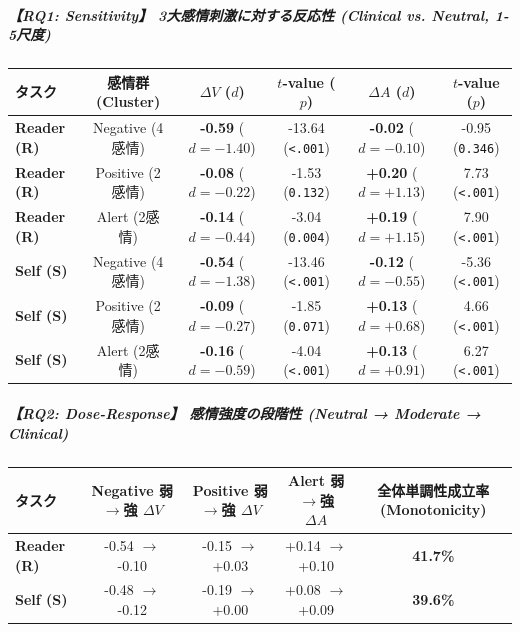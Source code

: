 \subparagraph{【RQ1: Sensitivity】 3大感情刺激に対する反応性 (Clinical vs. Neutral, 1-5尺度)}
\begin{center}
\small
\begin{tabular}{lccccc}
\toprule
\textbf{タスク} & \textbf{感情群 (Cluster)} & \textbf{$\Delta V$ ($d$)} & \textbf{$t$-value ($p$)} & \textbf{$\Delta A$ ($d$)} & \textbf{$t$-value ($p$)} \\
\midrule
\textbf{Reader (R)} & Negative (4感情) & \textbf{-0.59} ($d=-1.40$) & -13.64 (\texttt{<.001}) & \textbf{-0.02} ($d=-0.10$) & -0.95 (\texttt{0.346}) \\
\textbf{Reader (R)} & Positive (2感情) & \textbf{-0.08} ($d=-0.22$) & -1.53 (\texttt{0.132}) & \textbf{+0.20} ($d=+1.13$) & 7.73 (\texttt{<.001}) \\
\textbf{Reader (R)} & Alert (2感情) & \textbf{-0.14} ($d=-0.44$) & -3.04 (\texttt{0.004}) & \textbf{+0.19} ($d=+1.15$) & 7.90 (\texttt{<.001}) \\
\textbf{Self (S)} & Negative (4感情) & \textbf{-0.54} ($d=-1.38$) & -13.46 (\texttt{<.001}) & \textbf{-0.12} ($d=-0.55$) & -5.36 (\texttt{<.001}) \\
\textbf{Self (S)} & Positive (2感情) & \textbf{-0.09} ($d=-0.27$) & -1.85 (\texttt{0.071}) & \textbf{+0.13} ($d=+0.68$) & 4.66 (\texttt{<.001}) \\
\textbf{Self (S)} & Alert (2感情) & \textbf{-0.16} ($d=-0.59$) & -4.04 (\texttt{<.001}) & \textbf{+0.13} ($d=+0.91$) & 6.27 (\texttt{<.001}) \\
\bottomrule
\end{tabular}
\end{center}


\subparagraph{【RQ2: Dose-Response】 感情強度の段階性 (Neutral → Moderate → Clinical)}
\begin{center}
\small
\begin{tabular}{lcccc}
\toprule
\textbf{タスク} & \textbf{Negative 弱$\rightarrow$強 $\Delta V$} & \textbf{Positive 弱$\rightarrow$強 $\Delta V$} & \textbf{Alert 弱$\rightarrow$強 $\Delta A$} & \textbf{全体単調性成立率 (Monotonicity)} \\
\midrule
\textbf{Reader (R)} & -0.54 $\rightarrow$ -0.10 & -0.15 $\rightarrow$ +0.03 & +0.14 $\rightarrow$ +0.10 & \textbf{41.7\%} \\
\textbf{Self (S)} & -0.48 $\rightarrow$ -0.12 & -0.19 $\rightarrow$ +0.00 & +0.08 $\rightarrow$ +0.09 & \textbf{39.6\%} \\
\bottomrule
\end{tabular}
\end{center}



